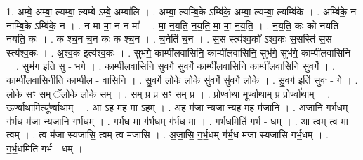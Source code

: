 \documentclass[17pt]{extarticle}
\begin{document}
1. अम्बे॒ अम्बा॒ ल्यम्बा॒ ल्यम्बे ऽम्बे॒ अम्बा॑लि । . अम्बा॒ ल्यम्बि॒के ऽम्बि॑के॒ अम्बा॒ ल्यम्बा॒ ल्यम्बि॑के । . अम्बि॑के॒ न नाम्बि॒के ऽम्बि॑के॒ न । . न मा॑ मा॒ न न मा᳚ । . मा॒ न॒य॒ति॒ न॒य॒ति॒ मा॒ मा॒ न॒य॒ति॒ । . न॒य॒ति॒ कः को न॑यति नयति॒ कः । . क श्च॒न च॒न कः क श्च॒न । . च॒नेति॑ च॒न । . स॒स स्त्य॑श्व॒को᳚ ऽश्व॒कः स॒सस्ति॑ स॒स स्त्य॑श्व॒कः । . अ॒श्व॒क इत्य॑श्व॒कः । . सुभ॑गे॒ काम्पी॑लवासिनि॒ काम्पी॑लवासिनि॒ सुभ॑गे॒ सुभ॑गे॒ काम्पी॑लवासिनि । . सुभ॑ग॒ इति॒ सु - भ॒गे॒ । . काम्पी॑लवासिनि सुव॒र्गे सु॑व॒र्गे काम्पी॑लवासिनि॒ काम्पी॑लवासिनि सुव॒र्गे । . काम्पी॑लवासि॒नीति॒ काम्पी॑ल - वा॒सि॒नि॒ । . सु॒व॒र्गे लो॒के लो॒के सु॑व॒र्गे सु॑व॒र्गे लो॒के । . सु॒व॒र्ग इति॑ सुवः - गे । . लो॒के सꣳ सम् ॅलो॒के लो॒के सम् । . सम् प्र प्र सꣳ सम् प्र । . प्रोर्ण्वा॑था मूर्ण्वाथा॒म् प्र प्रोर्ण्वा॑थाम् । . ऊ॒र्ण्वा॒था॒मित्यू᳚र्ण्वाथाम् । . आ ऽह म॒ह मा ऽहम् । . अ॒ह म॑जा न्यजा न्य॒ह म॒ह म॑जानि । . अ॒जा॒नि॒ ग॒र्भ॒धम् ग॑र्भ॒ध म॑जा न्यजानि गर्भ॒धम् । . ग॒र्भ॒ध मा ग॑र्भ॒धम् ग॑र्भ॒ध मा । . ग॒र्भ॒धमिति॑ गर्भ - धम् । . आ त्वम् त्व मा त्वम् । . त्व म॑जा स्यजासि॒ त्वम् त्व म॑जासि । . अ॒जा॒सि॒ ग॒र्भ॒धम् ग॑र्भ॒ध म॑जा स्यजासि गर्भ॒धम् । . ग॒र्भ॒धमिति॑ गर्भ - धम् । \newline
\end{document}
